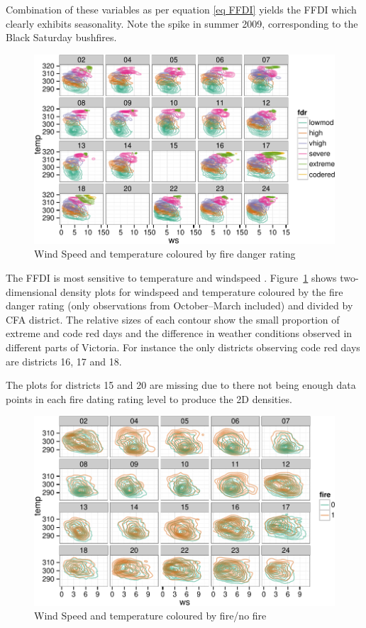 \documentclass[11pt,a4paper]{article}
\begin{document}
Combination of these variables as per equation \eqref{eq FFDI} yields the FFDI which clearly exhibits seasonality. Note the spike in summer 2009, corresponding to the Black Saturday bushfires.

\begin{figure}
  \centering
	\includegraphics[width=\textwidth]{figures/tw_fdr.pdf}
  \caption{Wind Speed and temperature coloured by fire danger rating}
  \label{fig:tw_fdr}
\end{figure}

The FFDI is most sensitive to temperature and windspeed \citep{dowdy10}. Figure~\ref{fig:tw_fdr} shows two-dimensional density plots for windspeed and temperature coloured by the fire danger rating (only observations from October--March included) and divided by CFA district. The relative sizes of each contour show the small proportion of extreme and code red days and the difference in weather conditions observed in different parts of Victoria. For instance the only districts observing code red days are districts 16, 17 and 18.

The plots for districts 15 and 20 are missing due to there not being enough data points in each fire dating rating level to produce the 2D densities.


\begin{figure}
  \centering
  \includegraphics[width=\textwidth]{figures/tw_fire.pdf}
  \caption{Wind Speed and temperature coloured by fire/no fire}
  \label{fig:tw_fire}
\end{figure}
\end{document}
